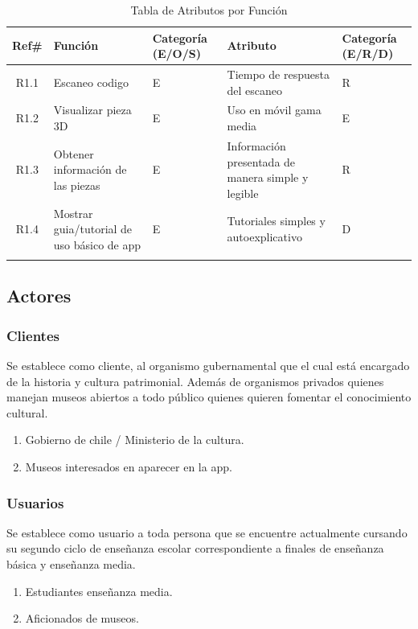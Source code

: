 \begin{longtable}{|c|p{4.7cm}|p{1.8cm}|p{4.7cm}|p{1.8cm}|}
\hline 
Ref\# & Función & Categoría (E/O/S) & Atributo & Categoría (E/R/D)\\ 
\hline 
R1.1 & Escaneo codigo & E & Tiempo de respuesta del escaneo & R \\ 
\hline 
R1.2 & Visualizar pieza 3D & E & Uso en móvil gama media & E \\ 
\hline
R1.3 & Obtener información de las piezas & E & Información presentada de manera simple y legible & R \\ 
\hline
R1.4 & Mostrar guia/tutorial de uso básico de app & E & Tutoriales simples y autoexplicativo & D \\ 
\hline
\caption{Tabla de Atributos por Función}
\label{tab20}\\
\end{longtable}

\newpage
\subsection{Actores}

\subsubsection{Clientes}
Se establece como cliente, al organismo gubernamental que el cual está encargado de la historia y cultura patrimonial. Además de organismos privados quienes manejan museos abiertos a todo público quienes quieren fomentar el conocimiento cultural.

\begin{enumerate}
	\item Gobierno de chile / Ministerio de la cultura.
	\item Museos interesados en aparecer en la app.
\end{enumerate}

\subsubsection{Usuarios}
Se establece como usuario a toda persona que se encuentre actualmente cursando su segundo ciclo de enseñanza escolar correspondiente a finales de enseñanza básica y enseñanza media.

\begin{enumerate}
	\item Estudiantes enseñanza media.
	\item Aficionados de museos.

\end{enumerate}


